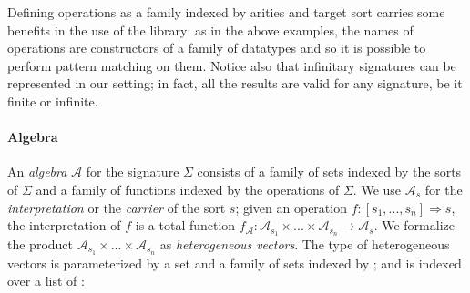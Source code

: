 \noindent Defining operations as a family indexed by arities and
target sort carries some benefits in the use of the library: as in
the above examples, the names of operations are constructors of a
family of datatypes and so it is possible to perform pattern matching
on them. Notice also that infinitary signatures can be represented in
our setting; in fact, all the results are valid for any signature, be
it finite or infinite.

\paragraph{Algebra}
An \emph{algebra} $\mathcal{A}$ for the signature $\Sigma$ consists of
a family of sets indexed by the sorts of $\Sigma$ and a family of
functions indexed by the operations of $\Sigma$. We use
$\mathcal{A}_s$ for the \emph{interpretation} or the \emph{carrier} of
the sort $s$; given an operation
$f \colon [s_1,...,s_n] \Rightarrow s$, the interpretation of $f$ is a
total function
$f_{\mathcal{A}}\colon \mathcal{A}_{s_1} \times ... \times
\mathcal{A}_{s_n} \rightarrow \mathcal{A}_s$.
We formalize the product $\mathcal{A}_{s_1} \times ... \times
\mathcal{A}_{s_n}$ as \emph{heterogeneous vectors}. The
type of heterogeneous vectors is parameterized by a set 
and a family of sets indexed by ; and is indexed over a
list of :

\begin{code}
\>[0]\AgdaSpace{}%
\AgdaSpace{}%
\AgdaSymbol{\{}\AgdaSymbol{\}}\AgdaSpace{}%
\AgdaSymbol{\{}\AgdaSpace{}%
\AgdaSymbol{:}\AgdaSpace{}%
\AgdaSymbol{\}}\AgdaSpace{}%
\AgdaSymbol{(}\AgdaSpace{}%
\AgdaSymbol{:}\AgdaSpace{}%
\AgdaSpace{}%
\AgdaSpace{}%
\AgdaSpace{}%
\AgdaSymbol{)}\AgdaSpace{}%
\AgdaSymbol{:}\AgdaSpace{}%
\AgdaSpace{}%
\AgdaSpace{}%
\AgdaSpace{}%
\AgdaSpace{}%
\AgdaSpace{}%
\<%
\\
\>[0][@{}l@{\AgdaIndent{0}}]%
\>[2]%
\>[6]\AgdaSymbol{:}\AgdaSpace{}%
\AgdaSpace{}%
\AgdaSpace{}%
\AgdaInductiveConstructor{[]}\<%
\\
%
\>[2]\AgdaSpace{}%
\AgdaSymbol{:}\AgdaSpace{}%
\AgdaSpace{}%
\AgdaSymbol{\{}\AgdaSpace{}%
\AgdaSymbol{\}}\AgdaSpace{}%
\AgdaSpace{}%
\AgdaSymbol{(}\AgdaSpace{}%
\AgdaSymbol{:}\AgdaSpace{}%
\AgdaSpace{}%
\AgdaSymbol{)}\AgdaSpace{}%
\AgdaSpace{}%
\AgdaSymbol{(}\AgdaSpace{}%
\AgdaSymbol{:}\AgdaSpace{}%
\AgdaSpace{}%
\AgdaSpace{}%
\AgdaSymbol{)}\AgdaSpace{}%
\AgdaSpace{}%
\AgdaSpace{}%
\AgdaSpace{}%
\AgdaSymbol{(}\AgdaSpace{}%
\AgdaSpace{}%
\AgdaSymbol{)}\<%
\end{code}


